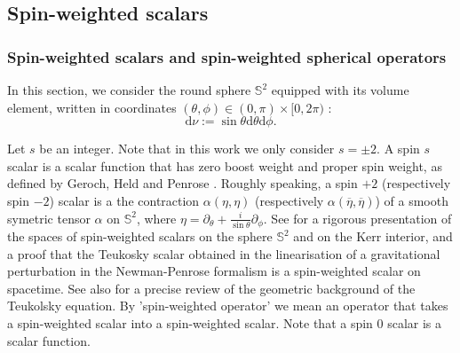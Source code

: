 \documentclass[reqno]{amsart}
\numberwithin{equation}{section}
\newcommand{\dee}{\mathrm{d}}
\newcommand{\sph}{\mathbb S}
\theoremstyle{plain}
\theoremstyle{definition}
\theoremstyle{remark}
\numberwithin{equation}{section}
\begin{document}
\subsection{Spin-weighted scalars}\label{section:spinscalars}
\subsubsection{Spin-weighted scalars and spin-weighted spherical operators}
In this section, we consider the round sphere $\sph^2$ equipped with its volume element, written in coordinates $(\theta,\phi)\in(0,\pi)\times[0,2\pi)$ :  
$$\dee\nu := \sin\theta\dee\theta\dee\phi.$$

Let $s$ be an integer. Note that in this work we only consider $s=\pm 2$. A spin $s$ scalar is a scalar function that has zero boost weight and proper spin weight, as defined by Geroch, Held and Penrose \cite{spin}. {Roughly speaking, a spin $+2$ (respectively spin $-2$) scalar is a the contraction $\alpha({\eta},{\eta})$ (respectively $\alpha(\overline{\eta},\overline{\eta})$) of a smooth 
symetric tensor $\alpha$ on $\mathbb{S}^2$, where $\eta=\partial_\theta+\frac{i}{\sin\theta}\partial_\phi$.} See \cite{sbierski} for a rigorous presentation of the spaces of spin-weighted scalars on the sphere $\sph^2$ and on the Kerr interior, and a proof that the Teukosky scalar obtained in the linearisation of a gravitational perturbation in the Newman-Penrose formalism is a spin-weighted scalar on spacetime. See also \cite{millet2} for a precise review of the geometric background of the Teukolsky equation. By 'spin-weighted operator' we mean an operator that takes a spin-weighted scalar into a spin-weighted scalar. Note that a spin $0$ scalar is a scalar function.
\end{document}
